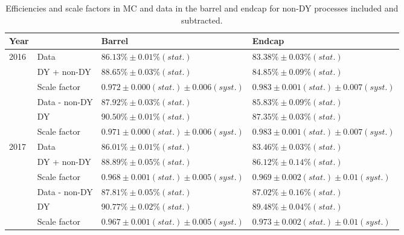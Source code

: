 \begin{table}[htp]
  \begin{center}
    \begin{tabular}{|l|l|l|l|}
      \hline
   Year &   & Barrel & Endcap \\ \hline \hline
\multirow{6}{*}{2016} &   Data          & $86.13\% \pm 0.01\%(stat.)$                   & $83.38\% \pm 0.03\%(stat.)$ \\
    &  DY + non-DY   & $88.65\% \pm 0.03\%(stat.)$                   & $84.85\% \pm 0.09\%(stat.)$ \\
    &  Scale factor  & $0.972  \pm 0.000(stat.)\pm 0.006(syst.)$     & $0.983   \pm 0.001(stat.) \pm 0.007(syst.) $ \\ \cline{2-4}
    &  Data - non-DY & $87.92\% \pm 0.03\%(stat.)$                   & $85.83\% \pm 0.09\%(stat.)$ \\
    &  DY            & $90.50\% \pm 0.01\%(stat.)$                   & $87.35\% \pm 0.03\%(stat.)$ \\
    &  Scale factor  & $0.971 \pm 0.000(stat.) \pm 0.006(syst.)$     & $0.983   \pm 0.001(stat.) \pm 0.007(syst.)$ \\
      \hline

\multirow{6}{*}{2017} &     Data          & $86.01\% \pm 0.01\%(stat.)$                   & $83.46\% \pm 0.03\%(stat.)$ \\
     & DY + non-DY   & $88.89\% \pm 0.05\%(stat.)$                   & $86.12\% \pm 0.14\%(stat.)$ \\
     & Scale factor  & $0.968  \pm 0.001(stat.)\pm 0.005(syst.)$     & $0.969   \pm 0.002(stat.)\pm 0.01(syst.)$ \\   \cline{2-4}
     & Data - non-DY & $87.81\% \pm 0.05\%(stat.)$                   & $87.02\% \pm 0.16\%(stat.)$ \\
     & DY            & $90.77\% \pm 0.02\%(stat.)$                   & $89.48\% \pm 0.04\%(stat.)$ \\
     & Scale factor  & $0.967 \pm 0.001(stat.)\pm 0.005(syst.)$      & $0.973   \pm 0.002(stat.)\pm 0.01(syst.)$ \\
      \hline
    \end{tabular}
  \end{center}
  \caption{\label{tab:HEEP_eff_nominal}
  Efficiencies and scale factors in MC and data in the barrel and endcap for non-DY processes included and subtracted.}
\end{table}


